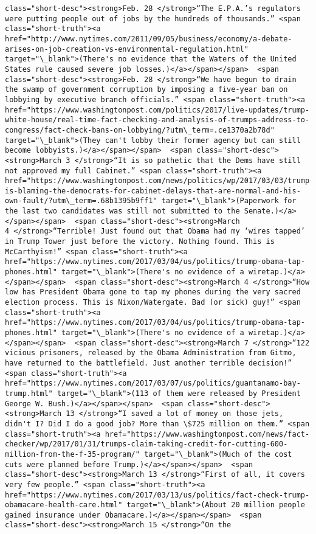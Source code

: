 \documentclass[11pt]{article}
\begin{document}
\begin{Verbatim}[commandchars=\\\{\}]
class="short-desc"><strong>Feb. 28 </strong>“The E.P.A.’s regulators were putting people out of jobs by the hundreds of thousands.” <span class="short-truth"><a href="http://www.nytimes.com/2011/09/05/business/economy/a-debate-arises-on-job-creation-vs-environmental-regulation.html" target="\_blank">(There's no evidence that the Waters of the United States rule caused severe job losses.)</a></span></span>  <span class="short-desc"><strong>Feb. 28 </strong>“We have begun to drain the swamp of government corruption by imposing a five-year ban on lobbying by executive branch officials.” <span class="short-truth"><a href="https://www.washingtonpost.com/politics/2017/live-updates/trump-white-house/real-time-fact-checking-and-analysis-of-trumps-address-to-congress/fact-check-bans-on-lobbying/?utm\_term=.ce1370a2b78d" target="\_blank">(They can't lobby their former agency but can still become lobbyists.)</a></span></span>  <span class="short-desc"><strong>March 3 </strong>“It is so pathetic that the Dems have still not approved my full Cabinet.” <span class="short-truth"><a href="https://www.washingtonpost.com/news/politics/wp/2017/03/03/trump-is-blaming-the-democrats-for-cabinet-delays-that-are-normal-and-his-own-fault/?utm\_term=.68b1395b9ff1" target="\_blank">(Paperwork for the last two candidates was still not submitted to the Senate.)</a></span></span>  <span class="short-desc"><strong>March 4 </strong>“Terrible! Just found out that Obama had my ‘wires tapped’ in Trump Tower just before the victory. Nothing found. This is McCarthyism!” <span class="short-truth"><a href="https://www.nytimes.com/2017/03/04/us/politics/trump-obama-tap-phones.html" target="\_blank">(There's no evidence of a wiretap.)</a></span></span>  <span class="short-desc"><strong>March 4 </strong>“How low has President Obama gone to tap my phones during the very sacred election process. This is Nixon/Watergate. Bad (or sick) guy!” <span class="short-truth"><a href="https://www.nytimes.com/2017/03/04/us/politics/trump-obama-tap-phones.html" target="\_blank">(There's no evidence of a wiretap.)</a></span></span>  <span class="short-desc"><strong>March 7 </strong>“122 vicious prisoners, released by the Obama Administration from Gitmo, have returned to the battlefield. Just another terrible decision!” <span class="short-truth"><a href="https://www.nytimes.com/2017/03/07/us/politics/guantanamo-bay-trump.html" target="\_blank">(113 of them were released by President George W. Bush.)</a></span></span>  <span class="short-desc"><strong>March 13 </strong>“I saved a lot of money on those jets, didn't I? Did I do a good job? More than \$725 million on them.” <span class="short-truth"><a href="https://www.washingtonpost.com/news/fact-checker/wp/2017/01/31/trumps-claim-taking-credit-for-cutting-600-million-from-the-f-35-program/" target="\_blank">(Much of the cost cuts were planned before Trump.)</a></span></span>  <span class="short-desc"><strong>March 13 </strong>“First of all, it covers very few people.” <span class="short-truth"><a href="https://www.nytimes.com/2017/03/13/us/politics/fact-check-trump-obamacare-health-care.html" target="\_blank">(About 20 million people gained insurance under Obamacare.)</a></span></span>  <span class="short-desc"><strong>March 15 </strong>“On the 
\end{Verbatim}
\end{document}
